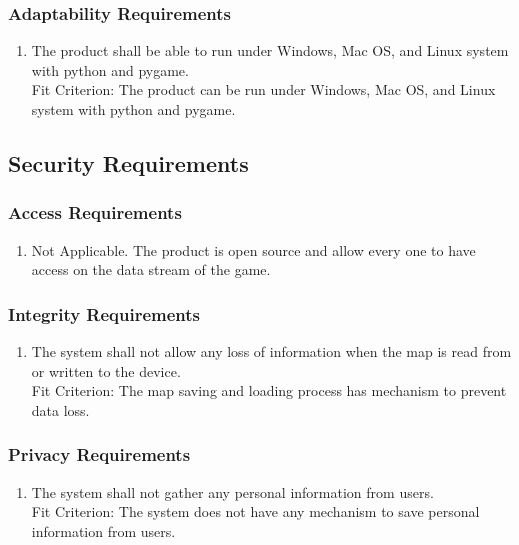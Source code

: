 \documentclass[12pt, titlepage]{article}
\begin{document}
\subsubsection{Adaptability Requirements}
\label{ssub:adaptability_requirements}
\begin{enumerate}[{MS}4. ]
	\item The product shall be able to run under Windows, Mac OS, and Linux system with python and pygame.
	\\
	
	Fit Criterion: The product can be run under Windows, Mac OS, and Linux system with python and pygame.
\end{enumerate}


\subsection{Security Requirements}
\label{sub:security_requirements}

\subsubsection{Access Requirements}
\label{ssub:access_requirements}
\begin{enumerate}[{SR}1. ]
	\item Not Applicable. The product is open source and allow every one to have access on the data stream of the game.
\end{enumerate}

\subsubsection{Integrity Requirements}
\label{ssub:integrity_requirements}
\begin{enumerate}[{SR}2. ]
	\item The system shall not allow any loss of information when the map is read from or written to the device.
	\\
	
	Fit Criterion: The map saving and loading process has mechanism to prevent data loss.
\end{enumerate}

\subsubsection{Privacy Requirements}
\label{ssub:privacy_requirements}
\begin{enumerate}[{SR}3. ]
	\item The system shall not gather any personal information from users.
	\\
	
	Fit Criterion: The system does not have any mechanism to save personal information from users.
\end{enumerate}
\end{document}
